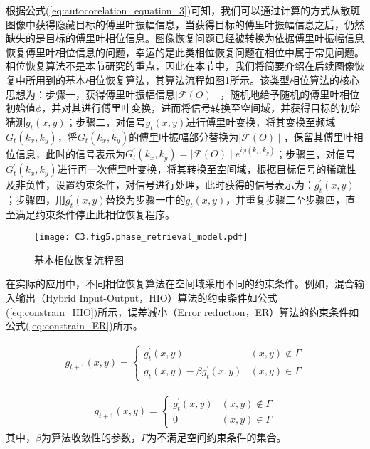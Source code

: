 根据公式(\ref{eq:autocorelation_equation_3})可知，我们可以通过计算的方式从散斑图像中获得隐藏目标的傅里叶振幅信息，当获得目标的傅里叶振幅信息之后，仍然缺失的是目标的傅里叶相位信息。图像恢复问题已经被转换为依据傅里叶振幅信息恢复傅里叶相位信息的问题，幸运的是此类相位恢复问题在相位中属于常见问题。相位恢复算法不是本节研究的重点，因此在本节中，我们将简要介绍在后续图像恢复中所用到的基本相位恢复算法，其算法流程如图\ref{fig:3.5}所示。该类型相位算法的核心思想为：步骤一，获得傅里叶振幅信息$\mid \mathcal{F}(O) \mid$，随机地给予随机的傅里叶相位初始值$\phi$，并对其进行傅里叶变换，进而将信号转换至空间域，并获得目标的初始猜测$g_t(x,y)$；步骤二，对信号$g_t(x,y)$进行傅里叶变换，将其变换至频域$G_t(k_x,k_y)$，将$G_t(k_x,k_y)$的傅里叶振幅部分替换为$\mid \mathcal{F}(O) \mid$，保留其傅里叶相位信息，此时的信号表示为$G^{\prime}_t(k_x,k_y) =\mid \mathcal{F}(O) \mid e^{i\phi (k_x,k_y)}$；步骤三，对信号$G^{\prime}_t(k_x,k_y)$进行再一次傅里叶变换，将其转换至空间域，根据目标信号的稀疏性及非负性，设置约束条件，对信号进行处理，此时获得的信号表示为：$g^{\prime}_t(x,y)$；步骤四，用$g^{\prime}_t(x,y)$替换为步骤一中的$g_t(x,y)$，并重复步骤二至步骤四，直至满足约束条件停止此相位恢复程序。

\begin{figure}[htp]
	\centering
	\texttt{[image: C3.fig5.phase\_retrieval\_model.pdf]}
	\caption{基本相位恢复流程图}
	\label{fig:3.5}
\end{figure}
在实际的应用中，不同相位恢复算法在空间域采用不同的约束条件。例如，混合输入输出（Hybrid Input-Output，HIO）算法的约束条件如公式(\ref{eq:constrain_HIO})所示，误差减小（Error reduction，ER）算法的约束条件如公式(\ref{eq:constrain_ER})所示。


\begin{equation}
\begin{aligned}
 g_{t+1}(x,y) =
		  \begin{cases}
		    g_{t}^{\prime}(x,y)   &   (x,y)\notin\Gamma\\
		    g_{t}(x,y)-\beta g_{t}^{\prime}(x,y) & (x,y)\in\Gamma
		  \end{cases}
\end{aligned}
\label{eq:constrain_HIO}
\end{equation}

\begin{equation}
\begin{aligned}
 g_{t+1}(x,y) =
		  \begin{cases}
		    g_{t}^{\prime}(x,y)   &   (x,y)\notin\Gamma\\
		    0  & (x,y)\in\Gamma
		  \end{cases}
\end{aligned}
\label{eq:constrain_ER}
\end{equation}
其中，$\beta$为算法收敛性的参数，$\Gamma$为不满足空间约束条件的集合。

